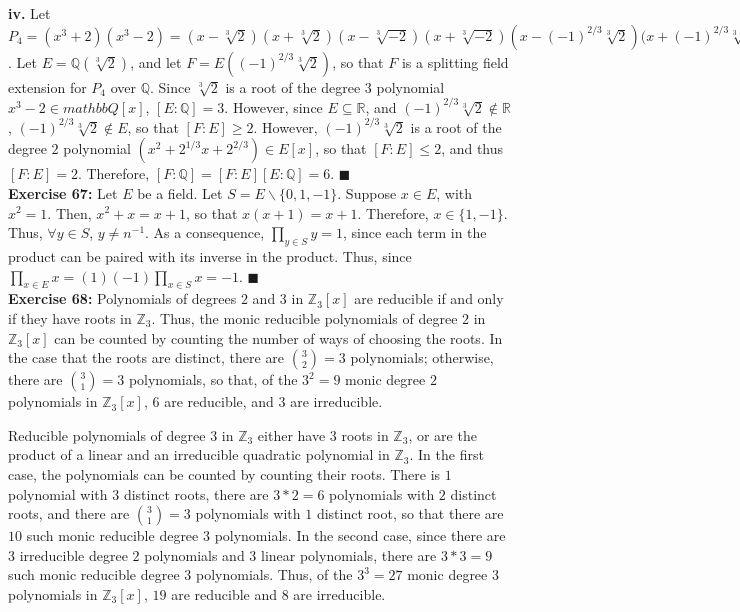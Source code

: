 \documentclass{article}
\begin{document}
\textbf{iv.} Let $P_4 = (x^3 + 2)(x^3 - 2) =
                                                (x - \sqrt[3]{2})
                                                (x + \sqrt[3]{2})
                                                (x - \sqrt[3]{-2})
                                                (x + \sqrt[3]{-2})
                                                (x - (-1)^{2/3}\sqrt[3]{2})
                                                (x + (-1)^{2/3}\sqrt[3]{-2}$.
Let $E = \mathbb{Q}(\sqrt[3]{2})$, and let $F = E((-1)^{2/3}\sqrt[3]{2})$, so
that $F$ is a splitting field extension for $P_4$ over $\mathbb{Q}$.
Since $\sqrt[3]{2}$ is a root of the degree $3$ polynomial
$x^3 - 2 \in mathbb{Q}[x]$, $[E : \mathbb{Q}] = 3$. However, since
$E \subseteq \mathbb{R}$, and $(-1)^{2/3}\sqrt[3]{2} \not \in \mathbb{R}$,
$(-1)^{2/3}\sqrt[3]{2} \not \in E$, so that $[F : E] \geq 2$. However,
$(-1)^{2/3}\sqrt[3]{2}$ is a root of the degree $2$ polynomial
$(x^2+2^{1/3} x+2^{2/3}) \in E[x]$, so that $[F : E] \leq 2$, and thus
$[F : E] = 2$. Therefore, $[F : \mathbb{Q}]  = [F : E][E : \mathbb{Q}] = 6$.
\qquad $\blacksquare$ \\

\textbf{Exercise 67:} Let $E$ be a field. Let $S = E \backslash \{0,1,-1\}$.
Suppose $x \in E$, with $x^2 = 1$. Then, $x^2 + x = x + 1$, so that
$x(x + 1) = x + 1$. Therefore, $x \in \{1,-1\}$. Thus, $\forall y \in S$,
$y \neq n^{-1}$. As a consequence, $\prod_{y \in S} y = 1$, since each term in
the product can be paired with its inverse in the product. Thus, since
$\prod_{x \in E} x = (1)(-1)\prod_{x \in S} x = -1$. \qquad $\blacksquare$ \\

\textbf{Exercise 68:}
Polynomials of degrees $2$ and $3$ in $\mathbb{Z}_3[x]$ are reducible
if and only if they have roots in $\mathbb{Z}_3$. Thus, the monic reducible
polynomials of degree $2$ in $\mathbb{Z}_3[x]$ can be counted by counting the
number of ways of choosing the roots. In the case that the roots are distinct,
there are ${3 \choose 2} = 3$ polynomials; otherwise, there are
${3 \choose 1} = 3$ polynomials, so that, of the $3^2 = 9$ monic degree $2$
polynomials in $\mathbb{Z}_3[x]$, $6$ are reducible, and $3$ are irreducible.

Reducible polynomials of degree $3$ in $\mathbb{Z}_3$ either have $3$ roots in
$\mathbb{Z}_3$, or are the product of a linear and an irreducible quadratic
polynomial in $\mathbb{Z}_3$. In the first case, the polynomials can be
counted by counting their roots. There is $1$ polynomial with
$3$ distinct roots, there are $3*2 = 6$ polynomials with $2$
distinct roots, and there are ${3 \choose 1} = 3$ polynomials with $1$
distinct root, so that there are $10$ such monic reducible degree $3$
polynomials. In the second case, since there are $3$ irreducible degree $2$
polynomials and $3$ linear polynomials, there are $3*3 = 9$ such monic
reducible degree $3$ polynomials. Thus, of the $3^3 = 27$ monic degree $3$
polynomials in $\mathbb{Z}_3[x]$, $19$ are reducible and $8$ are irreducible.
\end{document}
